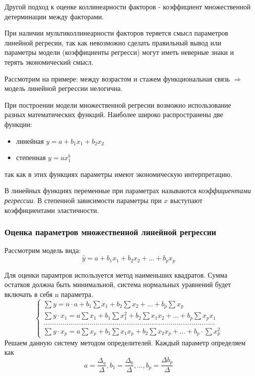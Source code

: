 \documentclass[aps,%
12pt,%
final,%
oneside,
onecolumn,%
musixtex, %
superscriptaddress,%
centertags]{article} %
\begin{document}
Другой подход к оценке коллинеарности факторов - коэффициент множественной детерминации между факторами.

При наличии мультиколлинеарности факторов теряется смысл параметров линейной регресии, так как невозможно сделать правильный вывод или параметры модели (коэффициенты регресси) могут иметь неверные знаки и терять экономический смысл.

Рассмотрим на примере: между возрастом и стажем функциональная связь $\Rightarrow$ модель линейной регрессии нелогична.

При построении модели множественной регресии возможно использование разных математических функций.
Наиболее широко распространены две функции:

\begin{itemize}
	\item линейная $y = a + b_1x_1 + b_2x_2 $
	\item степенная $y = ax_1^b $
\end{itemize}

так как в этих функциях параметры имеют экономическую интерпретацию.

В линейных функциях переменные при параметрах называются \textit{коэффициентами регрессии}. В степенной зависимости параметры при $x$ выступают коэффициентами эластичности.

\subsubsection{Оценка параметров множественной линейной регрессии}

Рассмотрим модель вида:
$$ \widehat{y} = a +b_1x_1 + b_2x_2 + \ldots + b_px_p$$

Для оценки парамтров используется метод наименьших квадратов. Сумма остатков должна быть минимальной, система нормальных уравнений будет включать в себя n параметра. 
$$\left \{
\begin{matrix}
	\sum y = n \cdot a + b_1 \sum x_1 + b_2 \sum x_2 + \ldots + b_p \sum x_p \\[0.3cm]
	\sum y \cdot x_1 = a \sum x_1 + b_1 \sum x_1^2 + b_2 \sum x_1x_2 + \ldots + b_p \sum x_p x_1 \\[0.3cm]
	......................................................................................... \\[0.3cm]
	\sum y \cdot x_p = a\sum x_p + b_1 \sum x_1x_p + b_2 \sum x_2x_p + \ldots + b_p \cdot \sum x_p^2
\end{matrix}
\right.
$$
Решаем данную систему методом определителей. Каждый параметр определяем как
$$ a =\frac{\Delta_a}{\Delta}, b_1 =\frac{\Delta_b}{\Delta}, \ldots , b_p = \frac{\Delta b_p}{\Delta} $$
\end{document}
